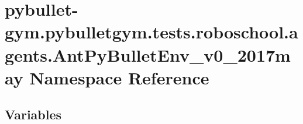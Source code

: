 \hypertarget{namespacepybullet-gym_1_1pybulletgym_1_1tests_1_1roboschool_1_1agents_1_1_ant_py_bullet_env__v0__2017may}{}\section{pybullet-\/gym.pybulletgym.\+tests.\+roboschool.\+agents.\+Ant\+Py\+Bullet\+Env\+\_\+v0\+\_\+2017may Namespace Reference}
\label{namespacepybullet-gym_1_1pybulletgym_1_1tests_1_1roboschool_1_1agents_1_1_ant_py_bullet_env__v0__2017may}
\subsection*{Variables}
